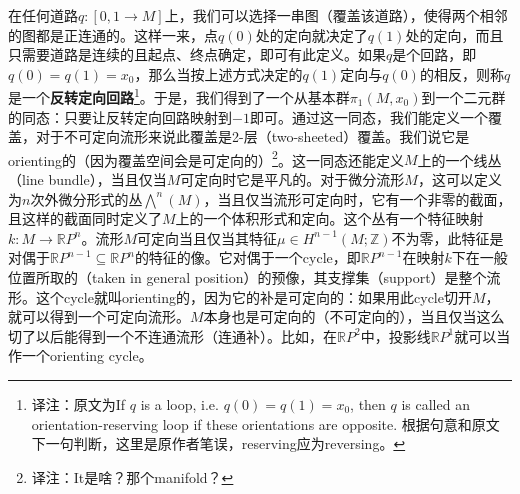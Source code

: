 



在任何道路$q:[0, 1\to M]$上，我们可以选择一串图（覆盖该道路），使得两个相邻的图都是正连通的。这样一来，点$q(0)$处的定向就决定了$q(1)$处的定向，而且只需要道路是连续的且起点、终点确定，即可有此定义。如果$q$是个回路，即$q(0)=q(1)=x_0$，那么当按上述方式决定的$q(1)$定向与$q(0)$的相反，则称$q$是一个\textbf{反转定向回路}\footnote{译注：原文为If $q$ is a loop, i.e. $q(0)=q(1)=x_0$, then $q$ is called an orientation-reserving loop if these orientations are opposite. 根据句意和原文下一句判断，这里是原作者笔误，reserving应为reversing。}。于是，我们得到了一个从基本群$\pi_1(M, x_0)$到一个二元群的同态：只要让反转定向回路映射到$-1$即可。通过这一同态，我们能定义一个覆盖，对于不可定向流形来说此覆盖是2-层（two-sheeted）覆盖。我们说它是orienting的（因为覆盖空间会是可定向的）\footnote{译注：It是啥？那个manifold？}。这一同态还能定义$M$上的一个线丛（line bundle），当且仅当$M$可定向时它是平凡的。对于微分流形$M$，这可以定义为$n$次外微分形式的丛$\bigwedge^n(M)$，当且仅当流形可定向时，它有一个非零的截面，且这样的截面同时定义了$M$上的一个体积形式和定向。这个丛有一个特征映射$k:M\to \mathbb{R}P^n$。流形$M$可定向当且仅当其特征$\mu\in H^{n-1}(M; \mathbb{Z})$不为零，此特征是对偶于$\mathbb{R}P^{n-1}\subseteq \mathbb{R}P^{n}$的特征的像。它对偶于一个cycle，即$\mathbb{R}P^{n-1}$在映射$k$下在一般位置所取的（taken in general position）的预像，其支撑集（support）是整个流形。这个cycle就叫orienting的，因为它的补是可定向的：如果用此cycle切开$M$，就可以得到一个可定向流形。$M$本身也是可定向的（不可定向的），当且仅当这么切了以后能得到一个不连通流形（连通补）。比如，在$\mathbb{R}P^2$中，投影线$\mathbb{R}P^1$就可以当作一个orienting cycle。

